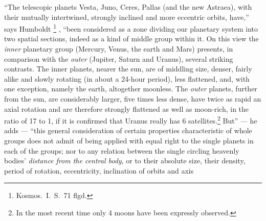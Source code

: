 \documentclass[12pt,a4paper]{book}
\renewcommand{\thefootnote}{*)}
\begin{document}
``The telescopic planets Vesta, Juno, Ceres, Pallas (and the new
Astraea), with their mutually intertwined, strongly inclined and more eccentric orbits, have,'' says
Humboldt%
\renewcommand{\thefootnote}{**)}%
\footnote{%
Kosmos.\ I.\ S.\ 71 flgd.}%
\renewcommand{\thefootnote}{*)}%
, ``been considered as a zone dividing our planetary system into two spatial sections, indeed as a kind of
middle group within it. On this view the \emph{inner} planetary group (Mercury, Venus, the earth and Mars)
presents, in comparison with the \emph{outer} (Jupiter, Saturn and Uranus), several striking contrasts. The
inner planets, nearer the sun, are of middling size, denser, fairly alike and slowly rotating (in about a
24-hour period), less flattened, and, with one exception, namely the earth, altogether moonless. The
\emph{outer} planets, further from the sun, are
considerably larger, five times less dense, have twice as rapid an axial rotation and are therefore strongly
flattened as well as moon-rich, in the ratio of 17 to 1, if it is confirmed that Uranus really has
6 satellites.\footnote{%
In the most recent time only 4 moons have been expressly observed.}
But'' --- he adds --- ``this general consideration of certain properties characteristic of whole groups does
not admit of being applied with equal right to the single planets in each of the groups; nor to any relation
between the single circling heavenly bodies'
\emph{distance from the central body}, or to their absolute size, their density, period of rotation,
eccentricity, inclination of orbits and
axis%
\renewcommand{\thefootnote}{**)}%
\end{document}
